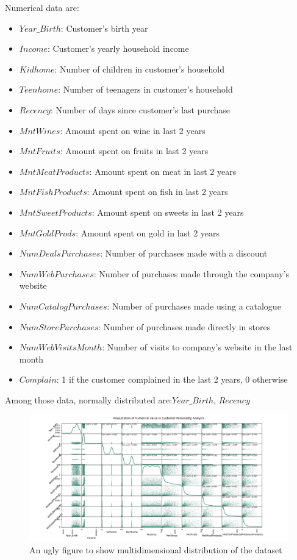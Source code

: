 Numerical data are:
\begin{itemize}
    \item $Year\_Birth$: Customer's birth year
    \item $Income$: Customer's yearly household income
    \item $Kidhome$: Number of children in customer's household
    \item $Teenhome$: Number of teenagers in customer's household
    \item $Recency$: Number of days since customer's last purchase
    \item $MntWines$: Amount spent on wine in last 2 years
    \item $MntFruits$: Amount spent on fruits in last 2 years
    \item $MntMeatProducts$: Amount spent on meat in last 2 years
    \item $MntFishProducts$: Amount spent on fish in last 2 years
    \item $MntSweetProducts$: Amount spent on sweets in last 2 years
    \item $MntGoldProds$: Amount spent on gold in last 2 years
    \item $NumDealsPurchases$: Number of purchases made with a discount
    \item $NumWebPurchases$: Number of purchases made through the company's website
    \item $NumCatalogPurchases$: Number of purchases made using a catalogue
    \item $NumStorePurchases$: Number of purchases made directly in stores
    \item $NumWebVisitsMonth$: Number of visits to company’s website in the last month
    \item $Complain$: 1 if the customer complained in the last 2 years, 0 otherwise
\end{itemize}

Among those data, normally distributed are:$Year\_Birth$, $Recency$

\begin{figure}[h]
    \centering
    \includegraphics[width=\textwidth]{images/numerical_visualization.png}
    \caption{An ugly figure to show multidimensional distribution of the dataset}
    \label{feature_fit}
\end{figure}

